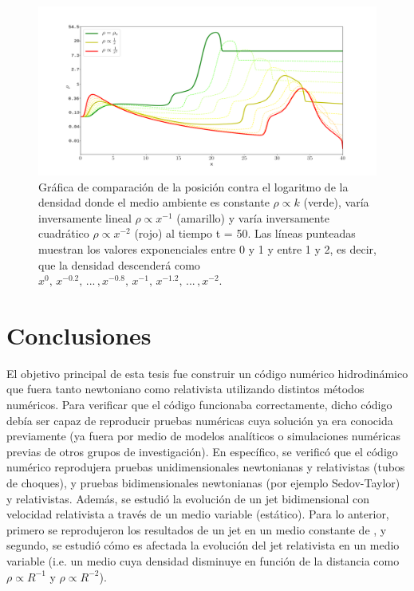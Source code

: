 \documentclass[12pt,a4paper]{book}
\begin{document}
\begin{figure}
  \centering
    \includegraphics[width=1\textwidth]{./Figuras/capitulo_4/perfiles/densidades_comparacion.png}
  \caption{Gráfica de comparación de la posición contra el logaritmo de la densidad 
  donde el medio ambiente es constante $\rho \varpropto k$ (verde), varía inversamente lineal
  $\rho \varpropto x^{-1}$ (amarillo) y varía inversamente cuadrático $\rho \varpropto x^{-2}$ (rojo)
  al tiempo t = 50.  Las líneas punteadas muestran los valores exponenciales entre 0 y 1 y entre 1 y 2,
  es decir, que la densidad descenderá como $x^0, \, x^{-0.2}, \, . . . \,  ,x^{-0.8} , \, x^{-1}  , \, x^{-1.2}
  , \, . . . \,  , x^{-2}$.}\label{fig:perfiles_comparacion_jet}
\end{figure}

\chapter{Conclusiones}
El objetivo principal de esta tesis fue construir un código numérico hidrodinámico que fuera tanto newtoniano como relativista utilizando distintos métodos numéricos. Para verificar que el código 
funcionaba correctamente, dicho código debía ser capaz de reproducir pruebas numéricas cuya solución ya era conocida previamente (ya fuera por medio de modelos analíticos o simulaciones numéricas previas de otros 
grupos de investigación). En específico, se verificó que el código numérico reprodujera pruebas unidimensionales newtonianas y relativistas (tubos de choques), y pruebas bidimensionales newtonianas 
(por ejemplo Sedov-Taylor) y relativistas. Además, se estudió la evolución de un jet bidimensional con velocidad relativista a través de un medio variable (estático). Para lo anterior, primero se reprodujeron los 
resultados de un jet en un medio constante de 
\citet{MB-HLLC-I}, y segundo, se estudió cómo es afectada la evolución del jet relativista en un medio variable (i.e. un medio cuya densidad disminuye en función de la distancia como 
$\rho \propto R^{-1}$ y $\rho \propto R^{-2}$).
\end{document}
